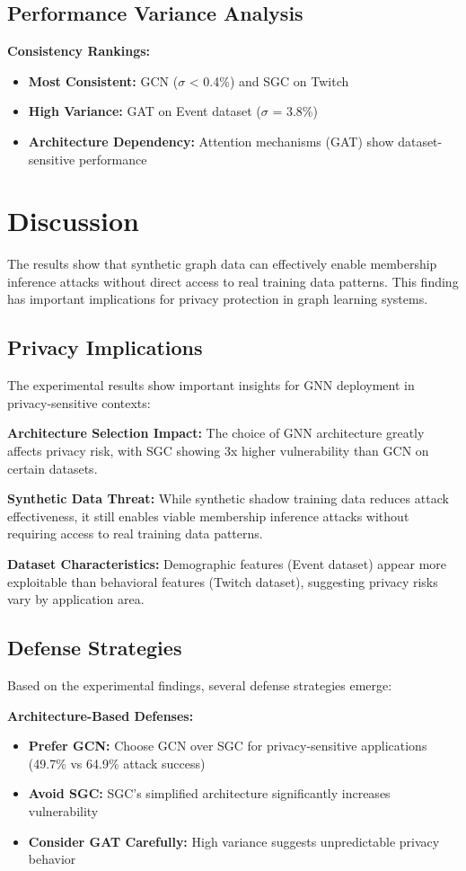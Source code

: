\documentclass{article}
\begin{document}
\subsection{Performance Variance Analysis}
\textbf{Consistency Rankings:}
\begin{itemize}
\item \textbf{Most Consistent:} GCN ($\sigma$ < 0.4\%) and SGC on Twitch
\item \textbf{High Variance:} GAT on Event dataset ($\sigma$ = 3.8\%)
\item \textbf{Architecture Dependency:} Attention mechanisms (GAT) show dataset-sensitive performance
\end{itemize}

\section{Discussion}
The results show that synthetic graph data can effectively enable membership inference attacks without direct access to real training data patterns. This finding has important implications for privacy protection in graph learning systems.

\subsection{Privacy Implications}
The experimental results show important insights for GNN deployment in privacy-sensitive contexts:

\textbf{Architecture Selection Impact:} The choice of GNN architecture greatly affects privacy risk, with SGC showing 3x higher vulnerability than GCN on certain datasets.

\textbf{Synthetic Data Threat:} While synthetic shadow training data reduces attack effectiveness, it still enables viable membership inference attacks without requiring access to real training data patterns.

\textbf{Dataset Characteristics:} Demographic features (Event dataset) appear more exploitable than behavioral features (Twitch dataset), suggesting privacy risks vary by application area.

\subsection{Defense Strategies}
Based on the experimental findings, several defense strategies emerge:

\textbf{Architecture-Based Defenses:}
\begin{itemize}
\item \textbf{Prefer GCN:} Choose GCN over SGC for privacy-sensitive applications (49.7\% vs 64.9\% attack success)
\item \textbf{Avoid SGC:} SGC's simplified architecture significantly increases vulnerability
\item \textbf{Consider GAT Carefully:} High variance suggests unpredictable privacy behavior
\end{itemize}
\end{document}
